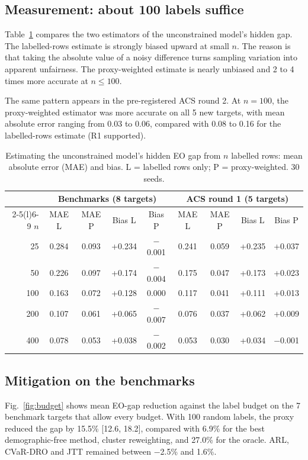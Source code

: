 \documentclass[conference]{IEEEtran}
\begin{document}
\subsection{Measurement: about 100 labels suffice}
Table~\ref{tab:measure} compares the two estimators of the unconstrained model's hidden gap. The labelled-rows estimate is strongly biased upward at small $n$. The reason is that taking the absolute value of a noisy difference turns sampling variation into apparent unfairness. The proxy-weighted estimate is nearly unbiased and 2 to 4 times more accurate at $n\le100$.

The same pattern appears in the pre-registered ACS round 2. At $n=100$, the proxy-weighted estimator was more accurate on all 5 new targets, with mean absolute error ranging from 0.03 to 0.06, compared with 0.08 to 0.16 for the labelled-rows estimate (R1 supported).

\begin{table}[t]
\caption{Estimating the unconstrained model's hidden EO gap from $n$ labelled rows: mean absolute error (MAE) and bias. L = labelled rows only; P = proxy-weighted. 30 seeds.}
\label{tab:measure}
\centering
\footnotesize
\setlength{\tabcolsep}{2.6pt}
\begin{tabular}{@{}r cccc cccc@{}}
\toprule
& \multicolumn{4}{c}{Benchmarks (8 targets)} & \multicolumn{4}{c}{ACS round 1 (5 targets)} \\
\cmidrule(lr){2-5}\cmidrule(l){6-9}
$n$ & MAE L & MAE P & Bias L & Bias P & MAE L & MAE P & Bias L & Bias P \\
\midrule
25 & 0.284 & 0.093 & +0.234 & $-$0.001 & 0.241 & 0.059 & +0.235 & +0.037 \\
50 & 0.226 & 0.097 & +0.174 & $-$0.004 & 0.175 & 0.047 & +0.173 & +0.023 \\
100 & 0.163 & 0.072 & +0.128 & 0.000 & 0.117 & 0.041 & +0.111 & +0.013 \\
200 & 0.107 & 0.061 & +0.065 & $-$0.007 & 0.076 & 0.037 & +0.062 & +0.009 \\
400 & 0.078 & 0.053 & +0.038 & $-$0.002 & 0.053 & 0.030 & +0.034 & $-$0.001 \\
\bottomrule
\end{tabular}
\end{table}

\subsection{Mitigation on the benchmarks}
Fig.~\ref{fig:budget} shows mean EO-gap reduction against the label budget on the 7 benchmark targets that allow every budget. With 100 random labels, the proxy reduced the gap by 15.5\% [12.6, 18.2], compared with 6.9\% for the best demographic-free method, cluster reweighting, and 27.0\% for the oracle. ARL, CVaR-DRO and JTT remained between $-$2.5\% and 1.6\%.
\end{document}
